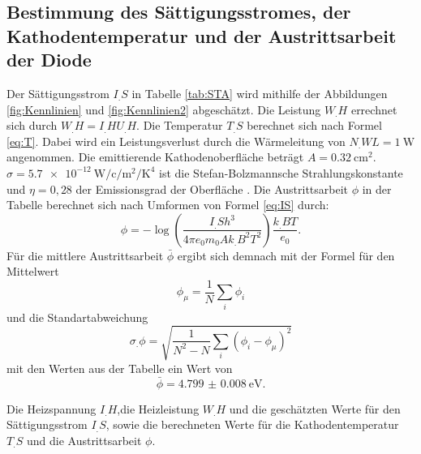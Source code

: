 \subsection{Bestimmung des Sättigungsstromes, der Kathodentemperatur und der Austrittsarbeit der Diode}

Der Sättigungsstrom $I_.S$ in Tabelle \ref{tab:STA} wird mithilfe der Abbildungen \ref{fig:Kennlinien} und \ref{fig:Kennlinien2} abgeschätzt.
Die Leistung $W_.H$ errechnet sich durch $W_.H = I_.H U_.H$.
Die Temperatur $T_.S$ berechnet sich nach Formel \eqref{eq:T}. Dabei wird ein Leistungsverlust durch die Wärmeleitung von $N_.{WL}=\SI{1}{\watt}$ angenommen. Die emittierende Kathodenoberfläche beträgt $A = \SI{0.32}{\centi\metre\squared}$. $\sigma=\SI{5.7e-12}{\watt\per\centi\per\metre\squared\per\kelvin\tothe{4}}$ ist die Stefan-Bolzmannsche Strahlungskonstante und $\eta=0,28$ der Emissionsgrad der Oberfläche \cite{V504}.
Die Austrittsarbeit $\phi$ in der Tabelle berechnet sich nach Umformen von Formel \eqref{eq:IS} durch:
\[
\phi = -\log\left(\frac{I_.Sh^3}{4\pi e_0m_0Ak_.B^2T^2}\right)\frac{k_.BT}{e_0}\text{.}
\]
Für die mittlere Austrittsarbeit $\bar{\phi}$ ergibt sich demnach mit der Formel für den Mittelwert
\[
\phi_\mu = \frac{1}{N}\sum_i\phi_i
\]
und die Standartabweichung
\[
\sigma_.{\phi}=\sqrt{\frac{1}{N^2-N}\sum_i \left(\phi_i-\phi_\mu\right)^2}
\]
mit den Werten aus der Tabelle ein Wert von
\[
\bar{\phi} = \SI{4.799(8)}{\electronvolt}\text{.}
\]

\begin{table}
\centering
\caption{Die Heizspannung $I_.H$,die Heizleistung $W_.H$ und die geschätzten Werte für den Sättigungsstrom $I_.S$, sowie die berechneten Werte für die Kathodentemperatur $T_.S$ und die Austrittsarbeit $\phi$.}

\label{tab:STA}
\end{table}